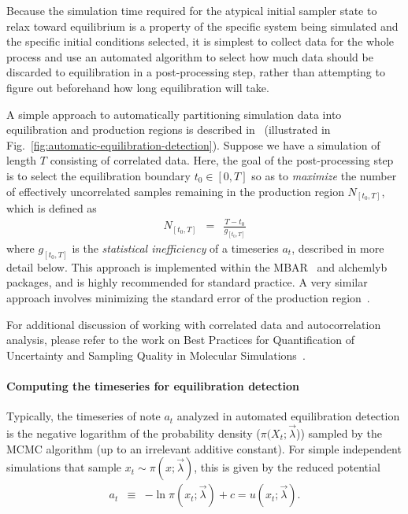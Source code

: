 \documentclass[9pt,bestpractices]{livecoms}
\begin{document}
Because the simulation time required for the atypical initial sampler state to relax toward equilibrium is a property of the specific system being simulated and the specific initial conditions selected, it is simplest to collect data for the whole process and use an automated algorithm to select how much data should be discarded to equilibration in a post-processing step, rather than attempting to figure out beforehand how long equilibration will take. 

A simple approach to automatically partitioning simulation data into equilibration and production regions is described in~\cite{chodera2016simple} (illustrated in Fig.~\ref{fig:automatic-equilibration-detection}).
Suppose we have a simulation of length $T$ consisting of correlated data.
Here, the goal of the post-processing step is to select the equilibration boundary $t_0 \in [0, T]$ so as to \emph{maximize} the number of effectively uncorrelated samples remaining in the production region $N_{[t_0,T]}$, which is defined as
\begin{eqnarray}
N_{[t_0,T]} &=& \frac{T - t_0}{g_{[t_0,T]}}
\end{eqnarray}
where $g_{[t_0,T]}$ is the \emph{statistical inefficiency} of a timeseries $a_t$, described in more detail below.
This approach is implemented within the MBAR~\cite{kylebeauchamp2019choderalab} and alchemlyb~\cite{daviddotson2019alchemistry} packages, and is highly recommended for standard practice. A very similar approach involves minimizing the standard error of the production region~\cite{whiteEffectiveTruncationHeuristic1997, sprattHeuristicsStartupProblem1998, hoadAutomatingWarmupLength2010, clarkRobustAutomatedTruncation2025}.

For additional discussion of working with correlated data and autocorrelation analysis, please refer to the work on Best Practices for Quantification of Uncertainty and Sampling Quality in Molecular Simulations~\cite{grossfield2018best}.


\paragraph{Computing the timeseries for equilibration detection}
Typically, the timeseries of note $a_t$ analyzed in automated equilibration detection is the negative logarithm of the probability density ($\pi(X_t; \vec{\lambda}$)) sampled by the MCMC algorithm (up to an irrelevant additive constant).
For simple independent simulations that sample $x_t \sim \pi(x ; \vec{\lambda})$, this is given by the reduced potential
\begin{eqnarray}
a_t &\equiv& - \ln \pi(x_t; \vec{\lambda}) + c = u(x_t; \vec{\lambda}) .
\end{eqnarray}
\end{document}
